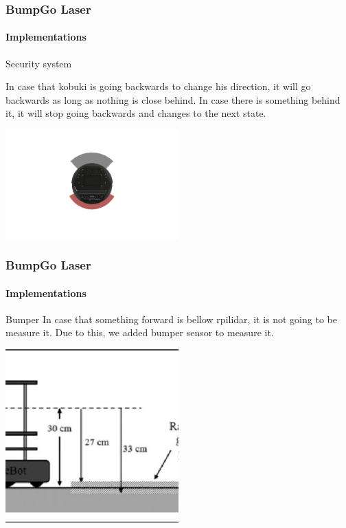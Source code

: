\documentclass{beamer}
\begin{document}
\begin{frame}
\frametitle{BumpGo Laser}
\framesubtitle{Implementations}

\begin{block}{Security system}
	
	In case that kobuki is going backwards to change his direction, it will  go 			backwards as long as nothing is close behind.
	In case there is something behind it, it will stop going backwards and changes to the next state.

\end{block}
\centering
\includegraphics[width=0.5\textwidth]{angle.jpeg}

\end{frame}


\begin{frame}
\frametitle{BumpGo Laser}
\framesubtitle{Implementations}

\begin{block}{Bumper}
	In case that something forward is bellow rpilidar, it is not going to be measure it. Due to this, we added bumper sensor to measure it.

\end{block}

\centering
\includegraphics[width=0.5\textwidth]{levels.jpeg}



\end{frame}
\end{document}
